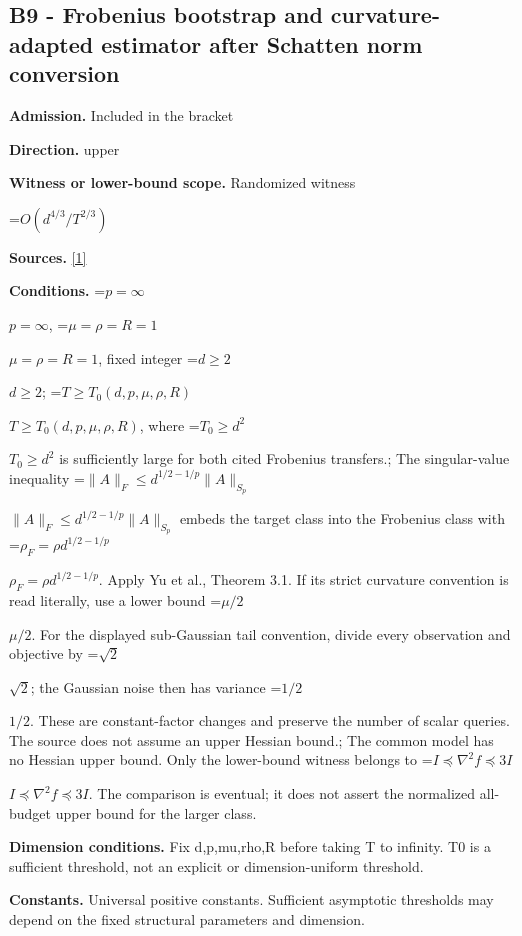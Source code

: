 \documentclass[10pt,a4paper]{article}
\newcommand{\AtlasMath}[1]{\par\begingroup\centering\setbox0=\hbox{$\displaystyle #1$}\ifdim\wd0>1.4\linewidth\typeout{ATLAS WIDE FORMULA: \the\wd0}\fi\ifdim\wd0>\linewidth\resizebox{\linewidth}{!}{\box0}\else\box0\fi\par\endgroup}
\newcommand{\AtlasInlineMath}[1]{\begingroup\setbox0=\hbox{$#1$}\ifdim\wd0>.4\linewidth\endgroup\AtlasMath{#1}\else\endgroup$#1$\fi}
\begin{document}
\subsection{B9 - Frobenius bootstrap and curvature-adapted estimator after Schatten norm conversion}


\textbf{Admission.} Included in the bracket



\textbf{Direction.} upper



\textbf{Witness or lower-bound scope.} Randomized witness



\AtlasMath{O(d^{4/3}/T^{2/3})}


\textbf{Sources.} \href{https://papers.nips.cc/paper_files/paper/2024/file/b444ad72520a5f5c467343be88e352ed-Paper-Conference.pdf}{[1]}



\textbf{Conditions.} \AtlasInlineMath{p=\infty}, \AtlasInlineMath{\mu=\rho=R=1}, fixed integer \AtlasInlineMath{d\ge2}; \AtlasInlineMath{T\ge T_0(d,p,\mu,\rho,R)}, where \AtlasInlineMath{T_0\ge d^2} is sufficiently large for both cited Frobenius transfers.; The singular-value inequality \AtlasInlineMath{\|A\|_F\le d^{1/2-1/p}\|A\|_{S_p}} embeds the target class into the Frobenius class with \AtlasInlineMath{\rho_F=\rho d^{1/2-1/p}}. Apply Yu et al., Theorem 3.1. If its strict curvature convention is read literally, use a lower bound \AtlasInlineMath{\mu/2}. For the displayed sub-Gaussian tail convention, divide every observation and objective by \AtlasInlineMath{\sqrt2}; the Gaussian noise then has variance \AtlasInlineMath{1/2}. These are constant-factor changes and preserve the number of scalar queries. The source does not assume an upper Hessian bound.; The common model has no Hessian upper bound. Only the lower-bound witness belongs to \AtlasInlineMath{I\preceq\nabla^2 f\preceq3I}. The comparison is eventual; it does not assert the normalized all-budget upper bound for the larger class.



\textbf{Dimension conditions.} Fix d,p,mu,rho,R before taking T to infinity. T0 is a sufficient threshold, not an explicit or dimension-uniform threshold.



\textbf{Constants.} Universal positive constants. Sufficient asymptotic thresholds may depend on the fixed structural parameters and dimension.
\end{document}
